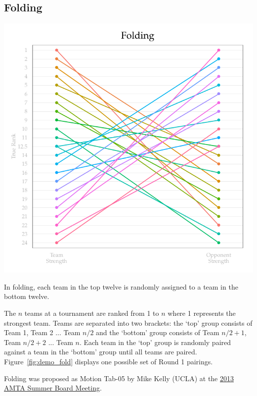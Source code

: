 \documentclass{tufte-handout}
\begin{document}
\subsection{Folding}
\begin{marginfigure}%
  \includegraphics[width=\linewidth]{folding_demo.pdf}
  \caption{In folding, each team in the top twelve is randomly assigned to a team in the bottom twelve.}
  \label{fig:demo_fold}
\end{marginfigure}

The $n$ teams at a tournament are ranked from 1 to $n$ where 1 represents the strongest team. Teams are separated into two brackets: the `top' group consists of Team 1, Team 2 ...  Team $n/2$ and the `bottom' group consists of Team $n/2 + 1$, Team $n/2 + 2$ ... Team $n$. Each team in the `top' group is randomly paired against a team in the `bottom' group until all teams are paired. Figure~\ref{fig:demo_fold} displays one possible set of Round 1 pairings.

Folding was proposed as Motion Tab-05 by Mike Kelly (UCLA) at the \href{http://www.collegemocktrial.org/2013AMTAagendafinal.pdf}{2013 AMTA Summer Board Meeting}.
\end{document}
